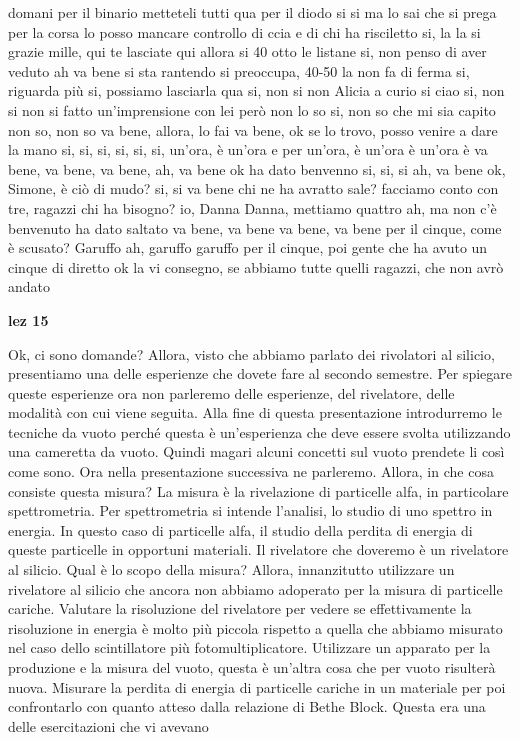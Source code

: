 domani per il binario metteteli tutti qua per il diodo si si ma lo sai che si prega per la corsa lo posso mancare controllo di ccia e di chi ha risciletto si, la la si grazie mille, qui te lasciate qui allora si 40 otto le listane si, non penso di aver veduto ah va bene si sta rantendo si preoccupa, 40-50 la non fa di ferma si, riguarda più si, possiamo lasciarla qua si, non si non Alicia a curio si ciao si, non si non si fatto un'imprensione con lei però non lo so si, non so che mi sia capito non so, non so va bene, allora, lo fai va bene, ok se lo trovo, posso venire a dare la mano si, si, si, si, si, si, un'ora, è un'ora e per un'ora, è un'ora è un'ora è va bene, va bene, va bene, ah, va bene ok ha dato benvenno si, si, si ah, va bene ok, Simone, è ciò di mudo? si, si va bene chi ne ha avratto sale? facciamo conto con tre, ragazzi chi ha bisogno? io, Danna Danna, mettiamo quattro ah, ma non c'è benvenuto ha dato saltato va bene, va bene va bene, va bene per il cinque, come è scusato? Garuffo ah, garuffo garuffo per il cinque, poi gente che ha avuto un cinque di diretto ok la vi consegno, se abbiamo tutte quelli ragazzi, che non avrò andato

\textbf{lez 15}

Ok, ci sono domande? Allora, visto che abbiamo parlato dei rivolatori al silicio, presentiamo una delle esperienze che dovete fare al secondo semestre. Per spiegare queste esperienze ora non parleremo delle esperienze, del rivelatore, delle modalità con cui viene seguita. Alla fine di questa presentazione introdurremo le tecniche da vuoto perché questa è un'esperienza che deve essere svolta utilizzando una cameretta da vuoto. Quindi magari alcuni concetti sul vuoto prendete li così come sono. Ora nella presentazione successiva ne parleremo. Allora, in che cosa consiste questa misura? La misura è la rivelazione di particelle alfa, in particolare spettrometria. Per spettrometria si intende l'analisi, lo studio di uno spettro in energia. In questo caso di particelle alfa, il studio della perdita di energia di queste particelle in opportuni materiali. Il rivelatore che doveremo è un rivelatore al silicio. Qual è lo scopo della misura? Allora, innanzitutto utilizzare un rivelatore al silicio che ancora non abbiamo adoperato per la misura di particelle cariche. Valutare la risoluzione del rivelatore per vedere se effettivamente la risoluzione in energia è molto più piccola rispetto a quella che abbiamo misurato nel caso dello scintillatore più fotomultiplicatore. Utilizzare un apparato per la produzione e la misura del vuoto, questa è un'altra cosa che per vuoto risulterà nuova. Misurare la perdita di energia di particelle cariche in un materiale per poi confrontarlo con quanto atteso dalla relazione di Bethe Block. Questa era una delle esercitazioni che vi avevano 

